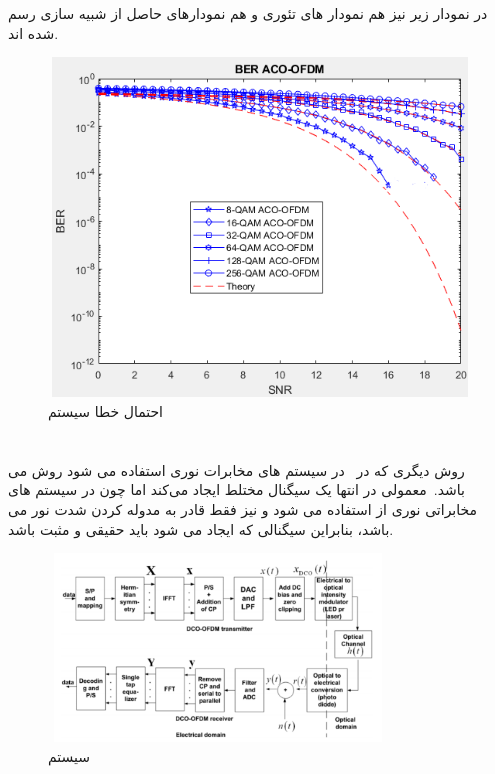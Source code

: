 \documentclass{article}
\begin{document}
در نمودار زیر نیز هم نمودار های تئوری و هم نمودارهای حاصل از شبیه سازی رسم شده اند.

\begin{figure}[H]
\begin{center}
\includegraphics[width=12cm, height=9cm]{acober.PNG}
\end{center}
\caption{احتمال خطا سیستم }
\label{acomod}

\end{figure}













\section{}
روش دیگری که در \ در سیستم های مخابرات نوری استفاده می شود روش        
می باشد.\ معمولی در انتها یک سیگنال مختلط ایجاد می‌کند اما چون در سیستم های مخابراتی نوری از   استفاده می شود و  نیز فقط قادر به مدوله کردن شدت نور می باشد، بنابراین سیگنالی که ایجاد می شود باید حقیقی و مثبت باشد. 

\begin{figure}[h!]
\begin{center}
\includegraphics[width=9cm, height=5cm]{dco.PNG}
\end{center}
\caption{  سیستم }
\label{dcomodel}

\end{figure}
\end{document}
